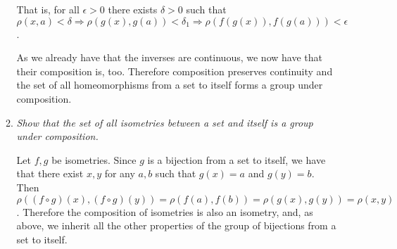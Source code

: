 \documentclass[12pt]{article}
\begin{document}
\begin{enumerate}
\begin{enumerate}
That is, for all $\epsilon>0$ there exists $\delta>0$ such that $\rho(x,a)<\delta \Rightarrow \rho(g(x),g(a))<\delta_1 \Rightarrow \rho(f(g(x)),f(g(a)))<\epsilon$.

As we already have that the inverses are continuous, we now have that their composition is, too.  Therefore composition preserves continuity and the set of all homeomorphisms from a set to itself forms a group under composition.

\item \emph{Show that the set of all isometries between a set and itself is a group under composition.}

Let $f,g$ be isometries.  Since $g$ is a bijection from a set to itself, we have that there exist $x,y$ for any $a,b$ such that $g(x)=a$ and $g(y)=b$.  Then $\rho((f \circ g)(x),(f \circ g)(y)) = \rho(f(a),f(b)) = \rho(g(x),g(y)) = \rho(x,y)$.  Therefore the composition of isometries is also an isometry, and, as above, we inherit all the other properties of the group of bijections from a set to itself.
\end{enumerate}
\end{enumerate}
\end{document}
